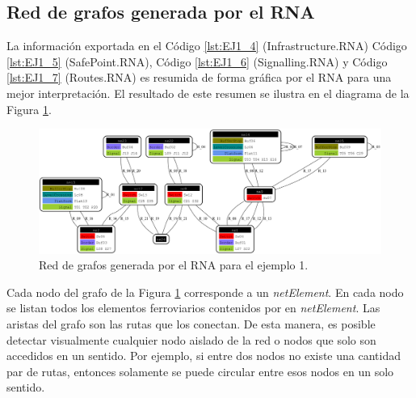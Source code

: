 \subsection{Red de grafos generada por el RNA}
	
 	La información exportada en el Código \ref{lst:EJ1_4} (Infrastructure.RNA) Código \ref{lst:EJ1_5} (SafePoint.RNA), Código \ref{lst:EJ1_6} (Signalling.RNA) y Código \ref{lst:EJ1_7} (Routes.RNA) es resumida de forma gráfica por el RNA para una mejor interpretación. El resultado de este resumen se ilustra en el diagrama de la Figura \ref{fig:EJ1_8}.

	\begin{figure}[H]
		\centering
		\includegraphics[origin = c, width=\textwidth]{Figuras/Graph_1}
		\centering\caption{Red de grafos generada por el RNA para el ejemplo 1.}
		\label{fig:EJ1_8}
	\end{figure}
	
	Cada nodo del grafo de la Figura \ref{fig:EJ1_8} corresponde a un \textit{netElement}. En cada nodo se listan todos los elementos ferroviarios contenidos por en \textit{netElement}. Las aristas del grafo son las rutas que los conectan. De esta manera, es posible detectar visualmente cualquier nodo aislado de la red o nodos que solo son accedidos en un sentido. Por ejemplo, si entre dos nodos no existe una cantidad par de rutas, entonces solamente se puede circular entre esos nodos en un solo sentido.